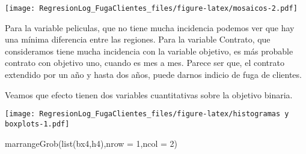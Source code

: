 \documentclass[
]{article}
\newenvironment{Shaded}{\begin{snugshade}}{\end{snugshade}}
\newcommand{\AttributeTok}[1]{\textcolor[rgb]{0.77,0.63,0.00}{#1}}
\newcommand{\CommentTok}[1]{\textcolor[rgb]{0.56,0.35,0.01}{\textit{#1}}}
\newcommand{\DecValTok}[1]{\textcolor[rgb]{0.00,0.00,0.81}{#1}}
\newcommand{\FunctionTok}[1]{\textcolor[rgb]{0.00,0.00,0.00}{#1}}
\newcommand{\NormalTok}[1]{#1}
\newcommand{\OtherTok}[1]{\textcolor[rgb]{0.56,0.35,0.01}{#1}}
\newcommand{\SpecialCharTok}[1]{\textcolor[rgb]{0.00,0.00,0.00}{#1}}
\newcommand{\StringTok}[1]{\textcolor[rgb]{0.31,0.60,0.02}{#1}}
\begin{document}
\texttt{[image: RegresionLog\_FugaClientes\_files/figure-latex/mosaicos-2.pdf]}

Para la variable peliculas, que no tiene mucha incidencia podemos ver
que hay una mínima diferencia entre las regiones. Para la variable
Contrato, que consideramos tiene mucha incidencia con la variable
objetivo, es más probable contrato con objetivo uno, cuando es mes a
mes. Parece ser que, el contrato extendido por un año y hasta dos años,
puede darnos indicio de fuga de clientes.

Veamos que efecto tienen dos variables cuantitativas sobre la objetivo
binaria.

\begin{Shaded}
\end{Shaded}

\texttt{[image: RegresionLog\_FugaClientes\_files/figure-latex/histogramas y boxplots-1.pdf]}

\begin{Shaded}
\begin{Highlighting}[]
\FunctionTok{marrangeGrob}\NormalTok{(}\FunctionTok{list}\NormalTok{(bx4,h4),}\AttributeTok{nrow =} \DecValTok{1}\NormalTok{,}\AttributeTok{ncol =} \DecValTok{2}\NormalTok{)}
\end{Highlighting}
\end{Shaded}
\end{document}
